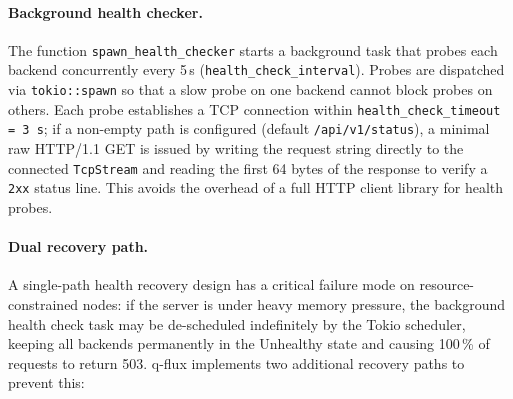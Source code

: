 \documentclass[a4paper, 11pt]{article}
\begin{document}
\paragraph{Background health checker.}  The function \texttt{spawn\_health\_checker}
starts a background task that probes each backend concurrently every 5\,s
(\texttt{health\_check\_interval}).  Probes are dispatched via
\texttt{tokio::spawn} so that a slow probe on one backend cannot block probes on
others.  Each probe establishes a TCP connection within
\texttt{health\_check\_timeout = 3\,s}; if a non-empty path is configured
(default \texttt{/api/v1/status}), a minimal raw HTTP/1.1 GET is issued
by writing the request string directly to the connected \texttt{TcpStream}
and reading the first 64 bytes of the response to verify a \texttt{2xx} status
line.  This avoids the overhead of a full HTTP client library for health probes.

\paragraph{Dual recovery path.}  A single-path health recovery design has a
critical failure mode on resource-constrained nodes: if the server is under
heavy memory pressure, the background health check task may be de-scheduled
indefinitely by the Tokio scheduler, keeping all backends permanently in the
Unhealthy state and causing 100\,\% of requests to return 503.  q-flux implements
two additional recovery paths to prevent this:
\end{document}
